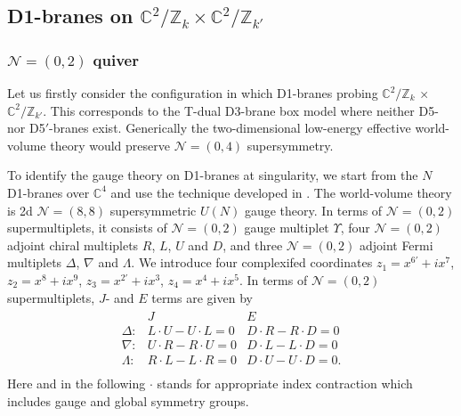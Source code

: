 \documentclass{article}
\numberwithin{equation}{section}
\begin{document}
 
 
 
 
 
 
\subsection{D1-branes on $\mathbb{C}^{2}/\mathbb{Z}_{k}\times \mathbb{C}^{2}/\mathbb{Z}_{k'}$}
\label{subsec_d1zkzk}


\subsubsection{$\mathcal{N}=(0,2)$ quiver}
\label{subsec_02quiver}
Let us firstly consider the configuration in which D1-branes probing 
$\mathbb{C}^{2}/\mathbb{Z}_{k}$ $\times$ $\mathbb{C}^{2}/\mathbb{Z}_{k'}$. 
This corresponds to the T-dual D3-brane box model where neither D5- nor D5$'$-branes exist. 
Generically the two-dimensional low-energy effective world-volume theory would preserve $\mathcal{N}=(0,4)$ supersymmetry. 

To identify the gauge theory on D1-branes at singularity, 
we start from the $N$ D1-branes over $\mathbb{C}^{4}$ 
and use the technique developed in \cite{Franco:2015tna}. 
The world-volume theory is 2d $\mathcal{N}=(8,8)$ supersymmetric $U(N)$ gauge theory. 
In terms of $\mathcal{N}=(0,2)$ supermultiplets, 
it consists of $\mathcal{N}=(0,2)$ gauge multiplet $\Upsilon$, 
four $\mathcal{N}=(0,2)$ adjoint chiral multiplets $R$, $L$, $U$ and $D$, 
and three $\mathcal{N}=(0,2)$ adjoint Fermi multiplets $\Delta$, $\nabla$ and $\Lambda$. 
We introduce four complexifed coordinates $z_{1}=x^{6'}+ix^{7}$, $z_{2}=x^{8}+ix^{9}$, 
$z_{3}=x^{2'}+ix^{3}$, $z_{4}=x^{4}+ix^{5}$. 
In terms of $\mathcal{N}=(0,2)$ supermultiplets, 
$J$- and $E$ terms are given by 
\begin{align}
\label{je_88}
\begin{array}{ccc}
&J&E \\
\Delta: &
L\cdot U-U\cdot L=0&
D\cdot R-R\cdot D=0\\
\nabla: &
U\cdot R-R\cdot U=0&
D\cdot L-L\cdot D=0\\
\Lambda: &
R\cdot L-L\cdot R=0&
D\cdot U-U\cdot D=0.\\
\end{array}
\end{align}
Here and in the following $\cdot$ stands for appropriate index contraction 
which includes gauge and global symmetry groups. 
\end{document}
